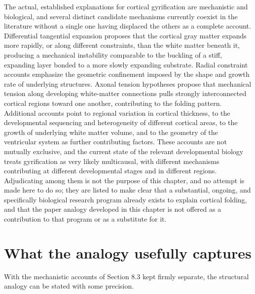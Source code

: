 \documentclass[11pt,oneside]{book}
\begin{document}
The actual, established explanations for cortical gyrification are
mechanistic and biological, and several distinct candidate mechanisms
currently coexist in the literature without a single one having
displaced the others as a complete account. Differential tangential
expansion proposes that the cortical gray matter expands more rapidly,
or along different constraints, than the white matter beneath it,
producing a mechanical instability comparable to the buckling of a
stiff, expanding layer bonded to a more slowly expanding substrate.
Radial constraint accounts emphasize the geometric confinement imposed
by the shape and growth rate of underlying structures. Axonal tension
hypotheses propose that mechanical tension along developing white-matter
connections pulls strongly interconnected cortical regions toward one
another, contributing to the folding pattern. Additional accounts point
to regional variation in cortical thickness, to the developmental
sequencing and heterogeneity of different cortical areas, to the growth
of underlying white matter volume, and to the geometry of the
ventricular system as further contributing factors. These accounts are
not mutually exclusive, and the current state of the relevant
developmental biology treats gyrification as very likely multicausal,
with different mechanisms contributing at different developmental stages
and in different regions. Adjudicating among them is not the purpose of
this chapter, and no attempt is made here to do so; they are listed to
make clear that a substantial, ongoing, and specifically biological
research program already exists to explain cortical folding, and that
the paper analogy developed in this chapter is not offered as a
contribution to that program or as a substitute for it.

\hypertarget{what-the-analogy-usefully-captures}{%
\section{What the analogy usefully
captures}\label{what-the-analogy-usefully-captures}}

With the mechanistic accounts of Section 8.3 kept firmly separate, the
structural analogy can be stated with some precision.
\end{document}
